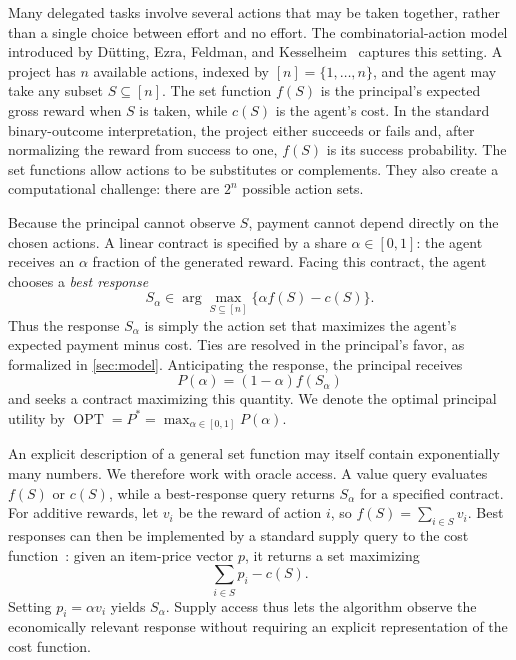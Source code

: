 \documentclass[11pt]{article}
\newcommand{\OPT}{\operatorname{OPT}}
\begin{document}
Many delegated tasks involve several actions that may be taken together,
rather than a single choice between effort and no effort.  The
combinatorial-action model introduced by D\"utting, Ezra, Feldman, and
Kesselheim~\cite{DEFK21} captures this setting.  A project has $n$ available
actions, indexed by $[n]=\{1,\ldots,n\}$, and the agent may take any subset
$S\subseteq[n]$.  The set function $f(S)$ is the principal's expected gross
reward when $S$ is taken, while $c(S)$ is the agent's cost.  In the standard
binary-outcome interpretation, the project either succeeds or fails and,
after normalizing the reward from success to one, $f(S)$ is its success
probability.  The set functions allow actions to be substitutes or
complements.  They also create a computational challenge: there are $2^n$
possible action sets.

Because the principal cannot observe $S$, payment cannot depend directly on
the chosen actions.  A linear contract is specified by a share
$\alpha\in[0,1]$: the agent receives an $\alpha$ fraction of the generated
reward.  Facing this contract, the agent chooses a \emph{best response}
\[
 S_\alpha\in\arg\max_{S\subseteq[n]}
                  \{\alpha f(S)-c(S)\}.
\]
Thus the response $S_\alpha$ is simply the action set that maximizes the
agent's expected payment minus cost.  Ties are resolved in the principal's
favor, as formalized in \cref{sec:model}.  Anticipating the response, the
principal receives
\[
             P(\alpha)=(1-\alpha)f(S_\alpha)
\]
and seeks a contract maximizing this quantity.  We denote the optimal
principal utility by $\OPT=P^*=\max_{\alpha\in[0,1]}P(\alpha)$.

An explicit description of a general set function may itself contain
exponentially many numbers.  We therefore work with oracle access.  A value
query evaluates $f(S)$ or $c(S)$, while a best-response query returns
$S_\alpha$ for a specified contract.  For additive rewards, let $v_i$ be the
reward of action $i$, so $f(S)=\sum_{i\in S}v_i$.  Best responses can then be implemented by a standard
supply query to the cost function~\cite{DFGR26}: given an item-price vector
$p$, it returns a set maximizing
\[
                   \sum_{i\in S}p_i-c(S).
\]
Setting $p_i=\alpha v_i$ yields $S_\alpha$.  Supply access thus lets the
algorithm observe the economically relevant response without requiring an
explicit representation of the cost function.
\end{document}
